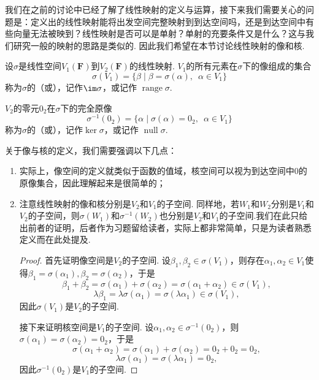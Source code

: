 我们在之前的讨论中已经了解了线性映射的定义与运算，接下来我们需要关心的问题是：定义出的线性映射能将出发空间完整映射到到达空间吗，还是到达空间中有些向量无法被映到？线性映射是否可以是单射？单射的充要条件又是什么？这与我们研究一般的映射的思路是类似的. 因此我们希望在本节讨论线性映射的像和核.
\begin{definition}{}{}
    设$\sigma$是线性空间$V_1(\mathbf{F})$到$V_2(\mathbf{F})$的线性映射. $V_1$的所有元素在$\sigma$下的像组成的集合
    \[\sigma(V_1)=\{\beta \mid \beta=\sigma(\alpha),\enspace \alpha \in V_1\}\]
    称为$\sigma$的（或），记作$\im \sigma$，或记作 $\operatorname{range}\sigma$.

    $V_2$的零元$0_2$在$\sigma$下的完全原像
    \[\sigma^{-1}(0_2)=\{\alpha \mid \sigma(\alpha)=0_2,\enspace \alpha \in V_1\}\]
    称为$\sigma$的（或），记作$\ker \sigma$，或记作 $\operatorname{null}\sigma$.
\end{definition}

关于像与核的定义，我们需要强调以下几点：
\begin{enumerate}
    \item 实际上，像空间的定义就类似于函数的值域，核空间可以视为到达空间中0的原像集合，因此理解起来是很简单的；

    \item 注意线性映射的像和核分别是$V_2$和$V_1$的子空间. 同样地，若$W_1$和$W_2$分别是$V_1$和$V_2$的子空间，则$\sigma(W_1)$和$\sigma^{-1}(W_2)$也分别是$V_2$和$V_1$的子空间.我们在此只给出前者的证明，后者作为习题留给读者，实际上都非常简单，只是为读者熟悉定义而在此处提及.
          \begin{proof}
              首先证明像空间是$V_2$的子空间. 设$\beta_1,\beta_2\in \sigma(V_1)$，则存在$\alpha_1,\alpha_2\in V_1$使得$\beta_1=\sigma(\alpha_1),\beta_2=\sigma(\alpha_2)$，于是
              \[\beta_1+\beta_2=\sigma(\alpha_1)+\sigma(\alpha_2)=\sigma(\alpha_1+\alpha_2)\in \sigma(V_1),\]
              \[\lambda\beta_1=\lambda\sigma(\alpha_1)=\sigma(\lambda\alpha_1)\in \sigma(V_1),\]
              因此$\sigma(V_1)$是$V_2$的子空间.

              接下来证明核空间是$V_1$的子空间. 设$\alpha_1,\alpha_2\in \sigma^{-1}(0_2)$，则$\sigma(\alpha_1)=\sigma(\alpha_2)=0_2$，于是
              \[\sigma(\alpha_1+\alpha_2)=\sigma(\alpha_1)+\sigma(\alpha_2)=0_2+0_2=0_2,\]
              \[\lambda\sigma(\alpha_1)=\sigma(\lambda\alpha_1)=0_2,\]
              因此$\sigma^{-1}(0_2)$是$V_1$的子空间.
          \end{proof}
\end{enumerate}

